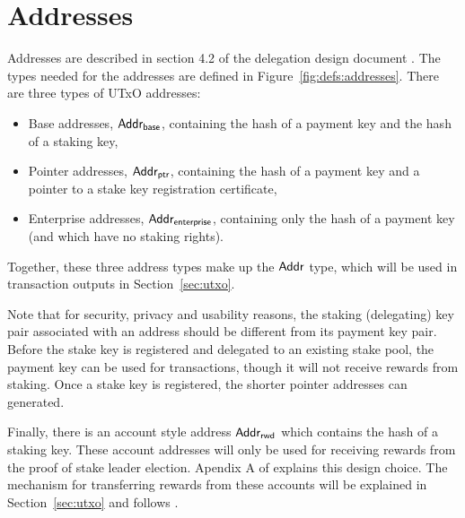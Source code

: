 \section{Addresses}
\label{sec:addresses}

Addresses are described in section 4.2 of the delegation design document \cite{delegation_design}.
The types needed for the addresses are defined in Figure~\ref{fig:defs:addresses}.
There are three types of UTxO addresses:
\begin{itemize}
  \item Base addresses, $\mathsf{Addr_{base}}$,
        containing the hash of a payment key and the hash of a staking key,
  \item Pointer addresses, $\mathsf{Addr_{ptr}}$,
        containing the hash of a payment key and a pointer to a stake key registration certificate,
  \item Enterprise addresses, $\mathsf{Addr_{enterprise}}$,
        containing only the hash of a payment key (and which have no staking rights).
\end{itemize}
Together, these three address types make up the $\mathsf{Addr}$ type, which will be used
in transaction outputs in Section~\ref{sec:utxo}.

Note that for security, privacy and usability reasons, the staking (delegating)
key pair associated with an address should be different from its payment key pair.
Before the stake key is registered and delegated to an existing stake pool,
the payment key can be used for transactions, though it will not receive rewards from staking.
Once a stake key is registered, the shorter pointer addresses can generated.

Finally, there is an account style address $\mathsf{Addr_{rwd}}$ which contains the hash of a staking key.
These account addresses will only be used for receiving rewards from the proof of
stake leader election.  Apendix A of \cite{delegation_design} explains this design choice.
The mechanism for transferring rewards from these accounts will be explained in
Section~\ref{sec:utxo} and follows \cite{chimeric}.

